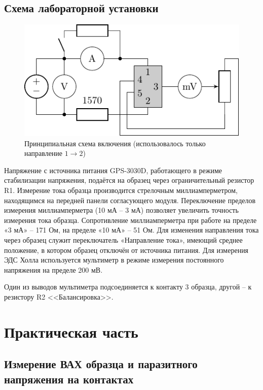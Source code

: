 \subsection*{Схема лабораторной установки}

\begin{figure}[h!]
	\centering
	\includegraphics[scale=1.5]{ris/chem.pdf}
	\caption{Принципиальная схема включения (использовалось только направление $1\to2$)}
	\label{fig:figure2}
\end{figure}

Напряжение с источника питания GPS-3030D, работающего в режиме стабилизации напряжения, подаётся на образец через
ограничительный резистор R1. Измерение тока образца производится стрелочным миллиамперметром, находящимся на передней
панели согласующего модуля. Переключение пределов измерения миллиамперметра (10 мА – 3 мА) позволяет увеличить точность
измерения тока образца. Сопротивление миллиамперметра при работе на пределе «3 мА» – 171 Ом, на пределе «10 мА» – 51 Ом.
Для изменения направления тока через образец служит переключатель «Направление тока», имеющий среднее положение, в
котором образец отключён от источника питания.
Для измерения ЭДС Холла используется мультиметр в режиме измерения постоянного напряжения на пределе 200 мВ. 

Один из выводов мультиметра подсоединяется к контакту 3 образца, другой – к резистору R2 <<Балансировка>>.


\section*{Практическая часть}
\subsection*{Измерение ВАХ образца и паразитного напряжения на контактах}

